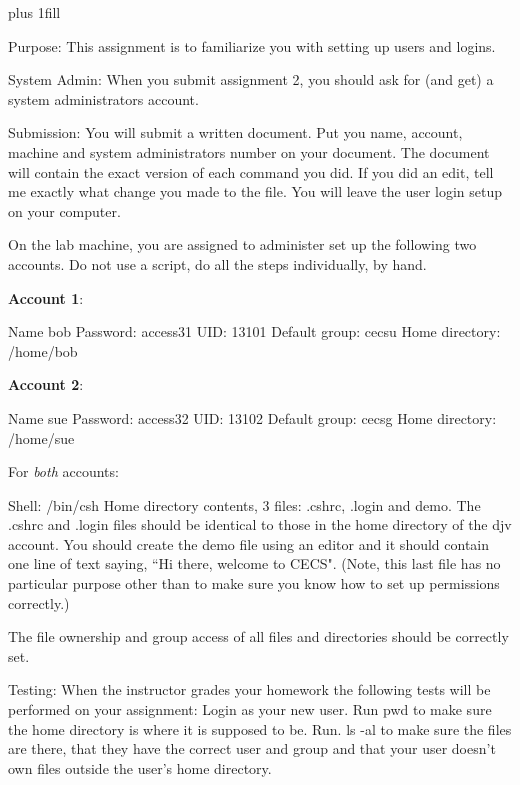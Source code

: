 
\rightskip=0pt plus 1fill

\parindent 0pt

Purpose: This assignment is to familiarize you with setting up users and logins.

System Admin: When you submit assignment 2, you should ask for (and get)
a system administrators account.

Submission: You will submit a written document.
Put you name, account, machine and system administrators number on your 
document.
The document will contain the exact version of each command you did.
If you did an edit, tell me exactly what change you made to the file. 
You will leave the user login setup on your computer.

On the lab machine, you are assigned to administer set up the
following two accounts.
Do not use a script, do all the steps individually, by hand.

{\bf Account 1}:

Name {\ltt{}bob}
\break
Password: access31
\break
UID: {\ltt{}13101}
\break
Default group: {\ltt{}cecsu}
\break
Home directory: {\ltt{}/home/bob}

{\bf Account 2}:

Name {\ltt{}sue}
\break
Password: access32
\break
UID: {\ltt{}13102}
\break
Default group: {\ltt{}cecsg}
\break
Home directory: {\ltt{}/home/sue}

For {\it both} accounts:

Shell: {\ltt{}/bin/csh}
\break
Home directory contents, 3 files:
{\ltt{}.cshrc}, {\ltt{}.login} and {\ltt{}demo}.
\break
The {\ltt{}.cshrc} and {\ltt{}.login} files should be identical to those in
the home directory of the {\ltt{}djv} account.
You should create the {\ltt{}demo} file using an editor
and it should contain one line of text saying,
``Hi there, welcome to CECS". 
(Note, this last file has no particular purpose other than
to make sure you know how to set up permissions correctly.)

The file ownership and group access of all files and directories
should be correctly set.

Testing:
\break
When the instructor grades your homework the following tests will be
performed on your assignment:
Login as your new user. Run {\ltt{}pwd} to make sure the home directory
is where it is supposed to be.
Run. {\ltt{}ls -al} to make sure the files are there, that they have
the correct user and group and that your user doesn't own files
outside the user's home directory.
\bye
